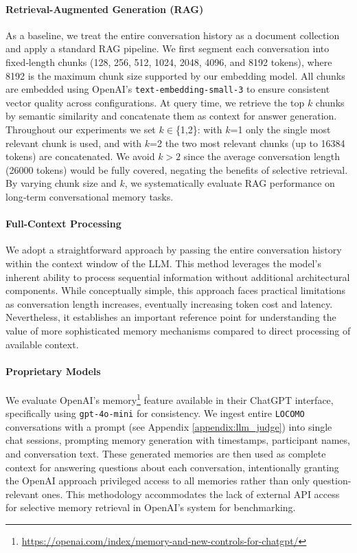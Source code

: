 \paragraph{Retrieval-Augmented Generation (RAG)}
As a baseline, we treat the entire conversation history as a document collection and apply a standard RAG pipeline. We first segment each conversation into fixed‐length chunks (128, 256, 512, 1024, 2048, 4096, and 8192 tokens), where 8192 is the maximum chunk size supported by our embedding model. All chunks are embedded using OpenAI’s \texttt{text-embedding-small-3} to ensure consistent vector quality across configurations. At query time, we retrieve the top $k$ chunks by semantic similarity and concatenate them as context for answer generation. Throughout our experiments we set $k$$\in$\{1,2\}: with $k$=1 only the single most relevant chunk is used, and with $k$=2 the two most relevant chunks (up to 16384 tokens) are concatenated. We avoid \(k>2\) since the average conversation length (26000 tokens) would be fully covered, negating the benefits of selective retrieval. By varying chunk size and \(k\), we systematically evaluate RAG performance on long‐term conversational memory tasks.


\paragraph{Full-Context Processing}
We adopt a straightforward approach by passing the entire conversation history within the context window of the LLM. This method leverages the model's inherent ability to process sequential information without additional architectural components. While conceptually simple, this approach faces practical limitations as conversation length increases, eventually increasing token cost and latency. Nevertheless, it establishes an important reference point for understanding the value of more sophisticated memory mechanisms compared to direct processing of available context.


\paragraph{Proprietary Models} We evaluate OpenAI's memory\footnote{\url{https://openai.com/index/memory-and-new-controls-for-chatgpt/}} feature available in their ChatGPT interface, specifically using \texttt{gpt-4o-mini} for consistency. We ingest entire \texttt{LOCOMO} conversations with a prompt (see Appendix \ref{appendix:llm_judge}) into single chat sessions, prompting memory generation with timestamps, participant names, and conversation text. These generated memories are then used as complete context for answering questions about each conversation, intentionally granting the OpenAI approach privileged access to all memories rather than only question-relevant ones. This methodology accommodates the lack of external API access for selective memory retrieval in OpenAI's system for benchmarking.

